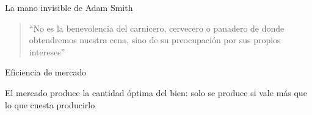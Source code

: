 \documentclass{beamer}
\begin{document}
\begin{frame}{La mano invisible de Adam Smith}
    \begin{quote}
    “No es la benevolencia del carnicero, cervecero o panadero de donde obtendremos nuestra cena, sino de su preocupación por sus propios intereses”
\end{quote}
\end{frame}

\begin{frame}{Eficiencia de mercado}

     \begin{figure}[H]{\textwidth}
         \centering
     \end{figure}
El mercado produce la cantidad óptima del bien: solo se produce si vale más que lo que cuesta producirlo
\end{frame}
\end{document}
